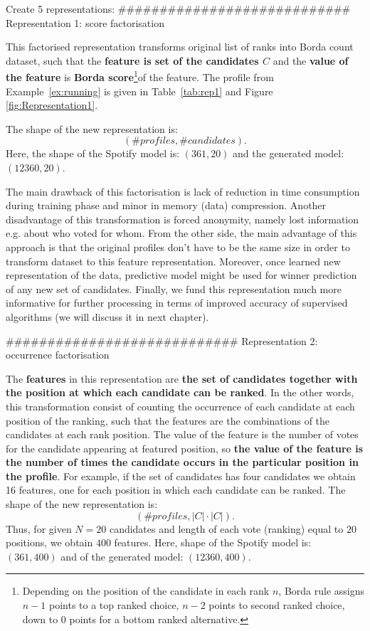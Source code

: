 Create 5 representations:
############################
Representation 1: score factorisation

This factorised representation transforms original list of ranks into Borda count dataset, such that the \textbf{feature is set of the candidates $C$} and the \textbf{value of the feature} is \textbf{Borda score}\footnote{ Depending on the position of the candidate in each rank $n$, Borda rule assigns $n-1$ points to a top ranked choice, $n-2$ points to second ranked choice, down to $0$ points for a bottom ranked alternative.}of the feature. The profile from Example~\ref{ex:running} is given in Table~\ref{tab:rep1} and Figure~ \ref{fig:Representation1}.

The shape of the new representation is:$$(\# profiles, \# candidates).$$ Here, the shape of the Spotify model is: $(361, 20)$ and the generated model: $(12360, 20)$.

The main drawback of this factorisation is lack of reduction in time consumption during training phase and minor in memory (data) compression. Another disadvantage of this transformation  is forced anonymity, namely lost information e.g. about who voted for whom. From the other side, the main advantage of this approach is that the original profiles don’t have to be the same size in order to transform dataset to this feature representation. Moreover, once learned new representation of the data, predictive model might be used for winner prediction of any new set of candidates. 
Finally, we fund this representation much more informative for further processing in terms of improved accuracy of supervised algorithms (we will discuss it in next chapter).

############################
Representation 2: occurrence factorisation

The \textbf{features} in this representation are \textbf{the set of candidates together with the position at which each candidate can be ranked}. In the other words, this transformation consist of counting the occurrence of each candidate at each position of the ranking, such that the features are the combinations of the candidates at each rank position. The value of the feature is the number of votes for the candidate appearing at featured position, so \textbf{the value of the feature is the number of times the candidate occurs in the particular position in the profile}. For example, if the set of candidates has four candidates we obtain 16 features, one for each position in which each candidate can be ranked.  The shape of the new representation is: $$( \# profiles, |C|\cdot|C|).$$ Thus, for given  $N = 20$  candidates  and length of each vote (ranking) equal to $20$ positions, we obtain $400$ features. Here, shape of the Spotify model is: $(361, 400)$ and of the generated model: $(12360, 400)$.

